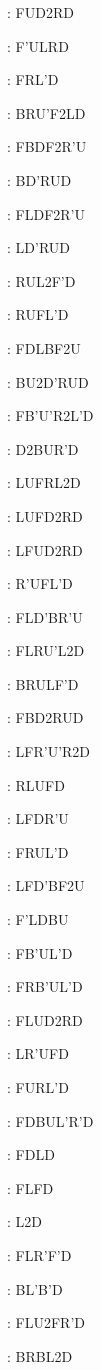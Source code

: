 \documentclass[9pt]{article}
\begin{document}
{\begin{multicols}{6}
: FUD2RD

: F'ULRD

: FRL'D

: BRU'F2LD

: FBDF2R'U

: BD'RUD

: FLDF2R'U

: LD'RUD

: RUL2F'D

: RUFL'D

: FDLBF2U

: BU2D'RUD

: FB'U'R2L'D

: D2BUR'D

: LUFRL2D

: LUFD2RD

: LFUD2RD

: R'UFL'D

: FLD'BR'U

: FLRU'L2D

: BRULF'D

: FBD2RUD

: LFR'U'R2D

: RLUFD

: LFDR'U

: FRUL'D

: LFD'BF2U

: F'LDBU

: FB'UL'D

: FRB'UL'D

: FLUD2RD

: LR'UFD

: FURL'D

: FDBUL'R'D

: FDLD

: FLFD

: L2D

: FLR'F'D

: BL'B'D

: FLU2FR'D

: BRBL2D


\end{multicols}}
\end{document}
